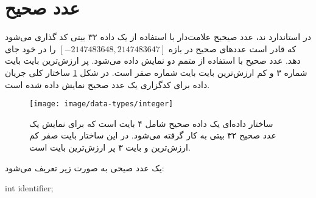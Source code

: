 


\section{عدد صحیح}


در استاندارد ند، عدد صیحیح علامت‌دار با استفاده از یک داده ۳۲ بیتی کد گذاری
می‌شود که قادر است عددهای صحیح در بازه $[-2147483648,2147483647]$ را در خود جای
دهد.
عدد صحیح با استفاده از متمم دو نمایش داده می‌شود.
پر ارزش‌ترین بایت بایت شماره ۳ و کم ‌ارزش‌ترین بایت بایت شماره صفر است.
در شکل \ref{image/data-types/integer} ساختار کلی جریان داده برای کدگزاری یک عدد
صحیح نمایش داده شده است.

% 

\begin{figure}
\centering
\texttt{[image: image/data-types/integer]}
\caption[کدگذاری یک داده صحیح]{
	ساختار داده‌ای یک داده صحیح شامل ۴ بایت است که برای نمایش یک عدد صحیح ۳۲ بیتی
	به کار گرفته می‌شود. در این ساختار بایت صفر کم ارزش‌ترین و بایت ۳ پر ارزش‌ترین
	بایت است.
}
\label{image/data-types/integer}
\end{figure}


یک عدد صیحی به صورت زیر تعریف می‌شود:

\begin{C++}
int identifier;
\end{C++}
